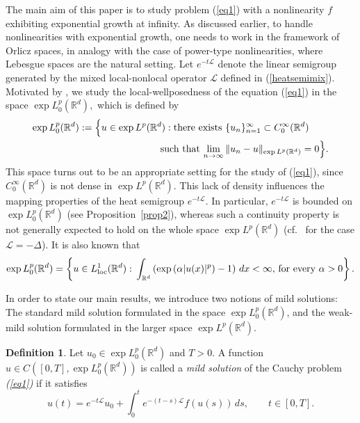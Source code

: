\documentclass[a4paper,11pt]{amsart}
\renewcommand\eqref[1]{(\ref{#1})} %
\numberwithin{equation}{section}
\theoremstyle{plain}
\theoremstyle{definition}
\newtheorem{definition}[theorem]{Definition}
\begin{document}
The main aim of this paper is to study problem \eqref{eq1} with a nonlinearity $f$ exhibiting exponential growth at infinity. As discussed earlier, to handle nonlinearities with exponential growth, one needs to work in the framework of Orlicz spaces, in analogy with the case of power-type nonlinearities, where Lebesgue spaces are the natural setting.  Let $e^{-t \mathcal{L}}$ denote the linear semigroup generated by the mixed local-nonlocal operator $\mathcal{L}$ defined in \eqref{heatsemimix}. Motivated by \cite{Ioku, Majdoub1,Majdoub2}, we study the local-wellposedness of the equation \eqref{eq1} in the space $\exp L^p_0(\mathbb{R}^d),$ which is defined by 
\begin{align*}\exp L^p_0(\mathbb{R}^d):=\Big\{u\in \exp L^p(\mathbb{R}^d): \textnormal{there exists $\{u_n\}_{n=1}^\infty\subset C^\infty_0(\mathbb{R}^d)$}\qquad\\
\quad\textnormal{such that $\lim_{n\rightarrow\infty}\|u_n-u\|_{\exp L^p(\mathbb{R}^d)}=0$}\Big\}.
\end{align*}
This space turns out to be an appropriate setting for the study of \eqref{eq1}, 
since $C_{0}^{\infty}(\mathbb{R}^{d})$ is not dense in 
$\exp L^{p}(\mathbb{R}^{d})$. This lack of density influences the mapping 
properties of the heat semigroup $e^{-t\mathcal{L}}$. In particular, 
$e^{-t\mathcal{L}}$ is bounded on $\exp L^{p}_{0}(\mathbb{R}^{d})$ 
(see Proposition~\ref{prop2}), whereas such a continuity property is not 
generally expected to hold on the whole space $\exp L^{p}(\mathbb{R}^{d})$ 
(cf.~\cite{Ioku} for the case $\mathcal{L}=-\Delta$). It is also known \cite{Ioku} that
$$\exp L^p_0(\mathbb{R}^d)=\left\{u\in L^1_{\rm{loc}}(\mathbb{R}^d):\,\int_{\mathbb{R}^d}\left(\exp\left(\alpha|u(x)|^p\right)-1\right)\,dx<\infty,\, \textnormal{for every}\,\, \alpha>0\right\}.$$

In order to state our main results,  we introduce two notions of mild solutions: 
The standard mild solution formulated in the space 
$\exp L^p_0(\mathbb{R}^d)$, 
and the weak-mild solution formulated in the larger space 
$\exp L^p(\mathbb{R}^d)$.

\begin{definition}\label{mild}
Let $u_0 \in \exp L^p_0(\mathbb{R}^d)$ and $T>0$. A function 
$u \in C([0,T], \exp L^p_0(\mathbb{R}^d))$ is called a {\it mild solution} of the Cauchy problem \emph{(\ref{eq1})} if it satisfies
\begin{equation}\label{eq2}
u(t)=e^{-t\mathcal{L}}u_0+\int_0^t e^{-(t-s)\mathcal{L}} f(u(s))\,ds,\qquad t\in[0,T].
\end{equation}
\end{definition}
\end{document}
